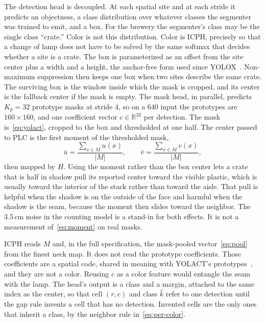 The detection head is decoupled. At each spatial site and at each stride it predicts an objectness, a class distribution over whatever classes the segmenter was trained to emit, and a box. For the brewery the segmenter's class may be the single class ``crate.'' Color is not this distribution. Color is ICPH, precisely so that a change of lamp does not have to be solved by the same softmax that decides whether a site is a crate. The box is parameterized as an offset from the site center plus a width and a height, the anchor-free form used since YOLOX~\cite{ge2021yolox}. Non-maximum suppression then keeps one box when two sites describe the same crate. The surviving box is the window inside which the mask is cropped, and its center is the fallback center if the mask is empty. The mask head, in parallel, predicts $K_{p}=32$ prototype masks at stride $4$, so on a $640$ input the prototypes are $160\times 160$, and one coefficient vector $c\in\mathbb{R}^{32}$ per detection. The mask is~\eqref{eq:yolact}, cropped to the box and thresholded at one half. The center passed to PLC is the first moment of the thresholded mask,
\begin{equation}
\bar u = \frac{\sum_{x\in M} u(x)}{\lvert M\rvert},
\qquad
\bar v = \frac{\sum_{x\in M} v(x)}{\lvert M\rvert},
\label{eq:moment}
\end{equation}
then mapped by $H$. Using the moment rather than the box center lets a crate that is half in shadow pull its reported center toward the visible plastic, which is usually toward the interior of the stack rather than toward the aisle. That pull is helpful when the shadow is on the outside of the face and harmful when the shadow is the seam, because the moment then slides toward the neighbor. The $3.5\,\mathrm{cm}$ noise in the counting model is a stand-in for both effects. It is not a measurement of~\eqref{eq:moment} on real masks.

ICPH reads $M$ and, in the full specification, the mask-pooled vector~\eqref{eq:pool} from the finest neck map. It does not read the prototype coefficients. Those coefficients are a spatial code, shared in meaning with YOLACT's prototypes~\cite{bolya2019yolact}, and they are not a color. Reusing $c$ as a color feature would entangle the seam with the lamp. The head's output is a class and a margin, attached to the same index as the center, so that cell $(r,c)$ and class $\hat k$ refer to one detection until the gap rule invents a cell that has no detection. Invented cells are the only ones that inherit a class, by the neighbor rule in~\eqref{eq:per-color}.

